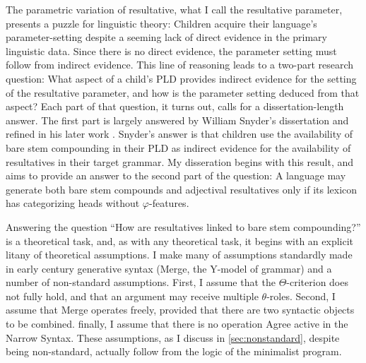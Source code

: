 \documentclass[MilwayThesis]{subfiles}
\begin{document}
The parametric variation of resultative, what I call the resultative parameter, presents a puzzle for linguistic theory:
Children acquire their language's parameter-setting despite a seeming lack of direct evidence in the primary linguistic data.
Since there is no direct evidence, the parameter setting must follow from indirect evidence.
This line of reasoning leads to a two-part research question:
What aspect of a child's PLD provides indirect evidence for the setting of the resultative parameter, and how is the parameter setting deduced from that aspect?
Each part of that question, it turns out, calls for a dissertation-length answer.
The first part is largely answered by William Snyder's dissertation \parencite{snyder1995language} and refined in his later work \parencite{snyder2001nature,snyder2012parameter,snyder2016compound}.
Snyder's answer is that children use the availability of bare stem compounding in their PLD as indirect evidence for the availability of resultatives in their target grammar.
My disseration begins with this result, and aims to provide an answer to the second part of the question: 
A language may generate both bare stem compounds and adjectival resultatives only if its lexicon has categorizing heads without $\varphi$-features.

Answering the question ``How are resultatives linked to bare stem compounding?'' is a theoretical task, and, as with any theoretical task, it begins with an explicit litany of theoretical assumptions.
I make many of assumptions standardly made in early  century generative syntax (Merge, the Y-model of grammar) and a number of non-standard assumptions.
First, I assume that the $\Theta$-criterion does not fully hold, and that an argument may receive multiple $\theta$-roles.
Second, I assume that Merge operates freely, provided that there are two syntactic objects to be combined.
finally, I assume that there is no operation Agree active in the Narrow Syntax.
These assumptions, as I discuss in \cref{sec:nonstandard}, despite being non-standard, actually follow from the logic of the minimalist program.
\end{document}
